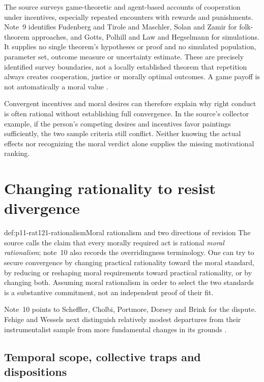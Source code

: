 The source surveys game-theoretic and agent-based accounts of
cooperation under incentives, especially repeated encounters with
rewards and punishments. Note~9 identifies Fudenberg and Tirole and
Maschler, Solan and Zamir for folk-theorem approaches, and Gotts,
Polhill and Law and Hegselmann for simulations. It supplies no
single theorem's hypotheses or proof and no simulated population,
parameter set, outcome measure or uncertainty estimate. These are
precisely identified survey boundaries, not a locally established
theorem that repetition always creates cooperation, justice or
morally optimal outcomes. A game payoff is not automatically a
moral value \parencite[pp.~684--685 and n.~9]{FehigeWessels2021Morality}.

Convergent incentives and moral desires can therefore explain why
right conduct is often rational without establishing full convergence.
In the source's collector example, if the person's competing desires
and incentives favor paintings sufficiently, the two sample criteria
still conflict. Neither knowing the actual effects nor recognizing
the moral verdict alone supplies the missing motivational ranking.

\section{Changing rationality to resist divergence}
\label{sec:p11-rat121-moralizing}

\begin{hbdefinition}{def:p11-rat121-rationalism}{Moral rationalism and two directions of revision}
The source calls the claim that every morally required act is rational
\emph{moral rationalism}; note~10 also records the overridingness
terminology. One can try to secure convergence by changing practical
rationality toward the moral standard, by reducing or reshaping moral
requirements toward practical rationality, or by changing both.
Assuming moral rationalism in order to select the two standards is
a substantive commitment, not an independent proof of their fit.
\end{hbdefinition}

Note~10 points to Scheffler, Cholbi, Portmore, Dorsey and Brink for
the dispute. Fehige and Wessels next distinguish relatively modest
departures from their instrumentalist sample from more fundamental
changes in its grounds \parencite[p.~685]{FehigeWessels2021Morality}.

\subsection{Temporal scope, collective traps and dispositions}

